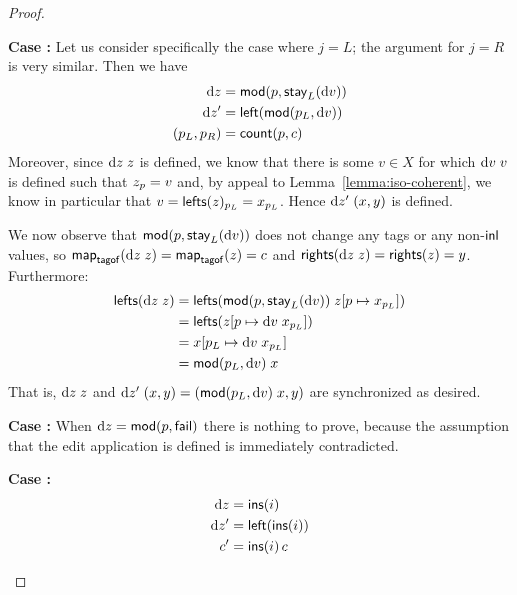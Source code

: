 \begin{proof}
{\begin{trivlist}
\item {\bf Case :} Let us consider specifically the case
    where $j=L$; the argument for $j=R$ is very similar. Then we have
    \begin{align*}
        \textrm{d} z &= \mathsf{mod}(p,\mathsf{stay}_L(\textrm{d} v)) \\
        \textrm{d} z' &= \mathsf{left}(\mathsf{mod}(p_L,\textrm{d} v)) \\
        (p_L,p_R) &= \mathsf{count}(p,c)
    \end{align*}
    Moreover, since $\textrm{d} z\;z$ is defined, we know that there is some $v \in
    X$ for which $\textrm{d} v\;v$ is defined such that $z_p =  v$ and, by
    appeal to Lemma~\ref{lemma:iso-coherent}, we know in particular that
    $v=\mathsf{lefts}(z)_{p_L}=x_{p_L}$. Hence $\textrm{d} z'\;(x,y)$ is defined.

    We now observe that $\mathsf{mod}(p,\mathsf{stay}_L(\textrm{d} v))$ does not change any tags or
    any non-$\mathsf{inl}$ values, so $\mathsf{map}_{\mathsf{tagof}}(\textrm{d} z\;z) =
    \mathsf{map}_{\mathsf{tagof}}(z) = c$ and $\mathsf{rights}(\textrm{d} z\;z) = \mathsf{rights}(z)
    = y$. Furthermore:
    \begin{align*}
        \mathsf{lefts}(\textrm{d} z\;z)
        &= \mathsf{lefts}(\mathsf{mod}(p,\mathsf{stay}_L(\textrm{d} v))\;z[p \mapsto {x_{p_L}}]) \\
        &= \mathsf{lefts}(z[p\mapsto{\textrm{d}v\;x_{p_L}}]) \\
        &= x[p_L\mapsto \textrm{d} v\;x_{p_L}] \\
        &= \mathsf{mod}(p_L,\textrm{d} v)\;x
    \end{align*}
    That is, $\textrm{d} z\;z$ and $\textrm{d} z'\;(x,y)=(\mathsf{mod}(p_L,\textrm{d} v)\;x,y)$ are synchronized as desired.

\item {\bf Case :}
    When $\textrm{d} z=\mathsf{mod}(p,\mathsf{fail})$ there is nothing to prove, because the
    assumption that the edit application is defined is immediately
    contradicted.

\item {\bf Case :}
    \begin{align*}
        \textrm{d} z &= \mathsf{ins}(i) \\
        \textrm{d} z' &= \mathsf{left}(\mathsf{ins}(i))  \\
        c' &= \mathsf{ins}(i)\,c
    \end{align*}


\end{trivlist}}
\end{proof}
